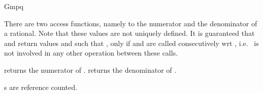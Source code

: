 \begin{ccRefClass} {Gmpq}

\ccOperations

There are two access functions, namely to the
numerator and the denominator of a rational.
Note that these values are not uniquely defined. 
It is guaranteed that  and 
 return values  and
 such that , only
if   and  are called
consecutively wrt , i.e.~ is not involved in 
any other operation between these calls.


       {returns the numerator of .}
\ccGlue
{}
       {returns the denominator of .}

\ccImplementation
{}s are reference counted.

\end{ccRefClass} 
